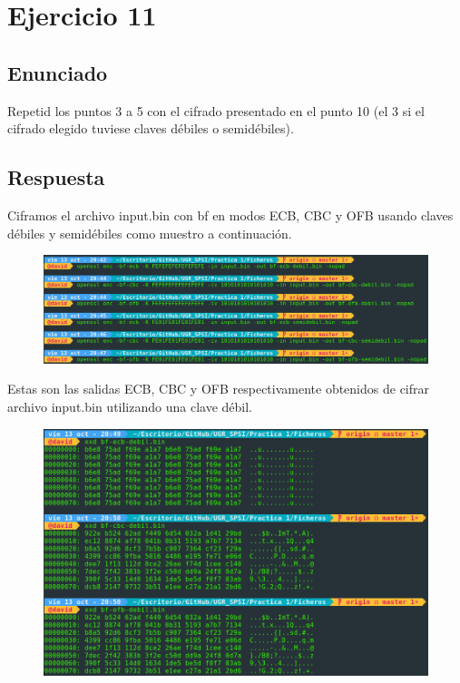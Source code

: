 \documentclass[10pt,a4paper,spanish]{report}
\begin{document}

\chapter{Ejercicio 11}

\section{Enunciado}
\noindent
Repetid los puntos 3 a 5 con el cifrado presentado en el punto 10 (el 3 si el cifrado elegido tuviese claves débiles o semidébiles).

\section{Respuesta}
\noindent
Ciframos el archivo input.bin con bf en modos ECB, CBC y OFB usando claves débiles y semidébiles como muestro a continuación.

\begin{figure}[!hbp]
 \centering  \includegraphics[width=1\textwidth]{./Imagenes/17.png}
\end{figure}

\noindent
Estas son las salidas ECB, CBC y OFB respectivamente obtenidos de cifrar archivo input.bin utilizando una clave débil.

\begin{figure}[!hbp]
 \centering  \includegraphics[width=1\textwidth]{./Imagenes/18.png}
\end{figure}
\end{document}

